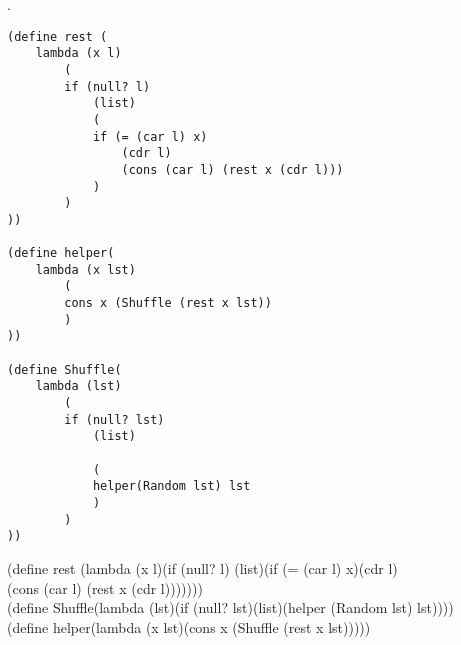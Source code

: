 \documentclass[12pt]{article}
\begin{document}
.
\begin{lstlisting}
(define rest (
    lambda (x l)
        (
        if (null? l) 
            (list)
            (
            if (= (car l) x)
                (cdr l)
                (cons (car l) (rest x (cdr l)))
            )
        )
))

(define helper(
    lambda (x lst)
        (
        cons x (Shuffle (rest x lst))
        )
))

(define Shuffle(
    lambda (lst)
        (
        if (null? lst)
            (list)

            (
            helper(Random lst) lst
            )
        )
))

\end{lstlisting}
(define rest (lambda (x l)(if (null? l) (list)(if (= (car l) x)(cdr l)\\
\indent (cons (car l) (rest x (cdr l)))))))\\
(define Shuffle(lambda (lst)(if (null? lst)(list)(helper (Random lst) lst))))\\
(define helper(lambda (x lst)(cons x (Shuffle (rest x lst)))))\\

\pagebreak


\end{document}
